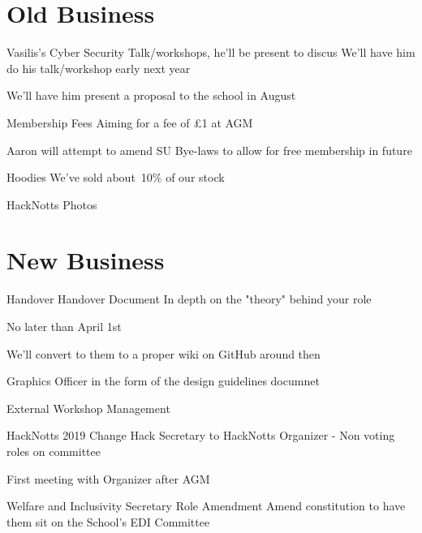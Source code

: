 \documentclass[11pt,hacksoc]{meetingmins}
\begin{document}
\section{Old Business}
\begin{items}
	\item
	Vasilis's Cyber Security Talk/workshops, he'll be present to discus
		\subitem
		We'll have him do his talk/workshop early next year
		
		\subitem
		We'll have him present a proposal to the school in August
	
	\item
	Membership Fees
		\subitem
		Aiming for a fee of \pounds1 at AGM
		
		\subitem
		Aaron will attempt to amend SU Bye-laws to allow for free membership in future
		
	\item
	Hoodies
		\subitem
		We've sold about~10\% of our stock
	
	\item
	HackNotts Photos
		\subitem
	
\end{items}

\section{New Business}
\begin{items}
	
	\item
	Handover
		\subitem
		Handover Document
			\subsubitem
			In depth on the "theory" behind your role
			
			\subsubitem
			No later than April 1st
			
			\subsubitem
			We'll convert to them to a proper wiki on GitHub around then
			
			\subsubitem
			Graphics Officer in the form of the design guidelines documnet
	
	\item
	External Workshop Management
		\subitem
	
	\item
	HackNotts 2019
		\subitem
		Change Hack Secretary to HackNotts Organizer - Non voting roles on committee
		
		\subitem
		First meeting with Organizer after AGM
	
	\item
	Welfare and Inclusivity Secretary Role Amendment
		\subitem
		Amend constitution to have them sit on the School's EDI Committee
	
\end{items}

\vspace{1em}
\end{document}
